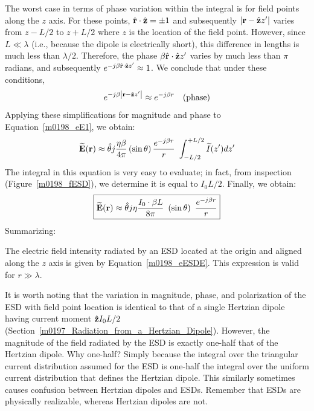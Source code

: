 %
The worst case in terms of phase variation within the integral is for field points along the $z$ axis.
For these points, $\hat{\bf r}\cdot\hat{\bf z}=\pm 1$ and subsequently $\left|{\bf r}-\hat{\bf z}z'\right|$ varies from 
$z-L/2$ to $z+L/2$ where $z$ is the location of the field point.
However, since $L\ll\lambda$ (i.e., because the dipole is electrically short), this difference in lengths is much less than $\lambda/2$.
Therefore, the phase $\beta \hat{\bf r}\cdot\hat{\bf z}z'$ varies by much less than $\pi$ radians, and subsequently $e^{-j\beta\hat{\bf r}\cdot\hat{\bf z}z'}\approx 1$. 
We conclude that under these conditions, 
%
\begin{equation}
e^{-j\beta \left|{\bf r}-\hat{\bf z}z'\right|} \approx e^{-j\beta r} ~~~\mbox{(phase)}
\end{equation}
%
Applying these simplifications for magnitude and phase to Equation~\ref{m0198_eE1}, we obtain:
%
\begin{equation}
\widetilde{\bf E}({\bf r}) \approx \hat{\bf \theta} j \frac{\eta\beta}{4\pi} \left(\sin\theta\right) \frac{e^{-j\beta r}}{r}~\int_{-L/2}^{+L/2} \widetilde{I}(z') dz'
\end{equation}
%
The integral in this equation is very easy to evaluate; in fact, from inspection (Figure~\ref{m0198_fESD}), we determine it is equal to $I_0L/2$.  
Finally, we obtain:
%
\begin{equation}
\boxed{
\widetilde{\bf E}({\bf r}) \approx  \hat{\bf \theta} j \eta \frac{I_0\cdot\beta L}{8\pi} ~\left(\sin\theta\right) ~\frac{e^{-j\beta r}}{r}
}
\label{m0198_eESDE}
\end{equation}
%
Summarizing:
%
\begin{mdframed}[backgroundcolor=yellow!20,nobreak=true] 
The electric field intensity radiated by an ESD located at the origin and aligned along the $z$ axis is given by Equation~\ref{m0198_eESDE}.
This expression is valid for $r\gg\lambda$.
\end{mdframed}

It is worth noting that the variation in magnitude, phase, and polarization of the ESD with field point location 
is identical to that of a single Hertzian dipole having current moment $\hat{\bf z} I_0 L/2$ (Section~\ref{m0197_Radiation_from_a_Hertzian_Dipole}).
However, the magnitude of the field radiated by the ESD is exactly one-half that of the Hertzian dipole.
Why one-half? Simply because the integral over the triangular current distribution assumed for the ESD is one-half the integral over the uniform current distribution that defines the Hertzian dipole. 
This similarly sometimes causes confusion between Hertzian dipoles and ESDs.  
Remember that ESDs are physically realizable, whereas Hertzian dipoles are not.

